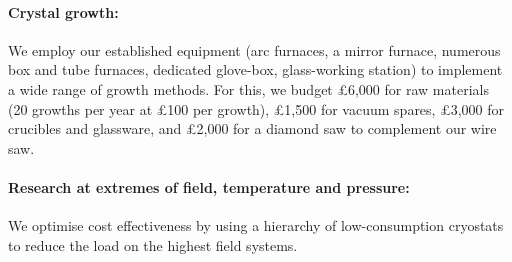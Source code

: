 \documentclass[prl,a4paper,11pt]{revtex4-2}
\begin{document}
\begin{singlespace}


\paragraph{Crystal growth:}
We employ our established equipment (arc furnaces, a mirror furnace, numerous box and tube furnaces, dedicated glove-box, glass-working station)
to implement a wide range of growth methods. For this, we budget  \pounds 6,000 for raw materials (20 growths per
year at \pounds 100 per growth), \pounds 1,500 for vacuum spares, \pounds 3,000
for crucibles and glassware, and \pounds 2,000 for a diamond saw to
complement our wire saw. 

\paragraph{Research at extremes of field, temperature and pressure:}
We optimise cost
effectiveness by using a hierarchy of low-consumption cryostats
to reduce the load on the highest field systems.  


\end{singlespace}
\end{document}
